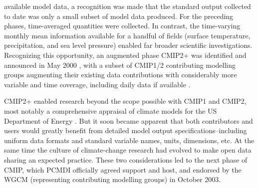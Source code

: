 \documentclass[gmd, preprint]{copernicus}
\newcommand{\mycomment}[1]{}
\begin{document}
available model data, a recognition was made that the standard output collected to date was only a small subset of model data produced. For the preceding phases, time-averaged quantities were collected. In contrast, the time-varying monthly mean information available for a handful of fields (surface temperature, precipitation, and sea level pressure) enabled far broader scientific investigations. Recognizing this opportunity, an augmented phase CMIP2+ was identified and announced in May 2000 \citep{villwock_6th_2003, meehl_cmip_2003, meehl_overview_2005}, with a subset of CMIP1/2 contributing modelling groups augmenting their existing data contributions with considerably more variable and time coverage, including daily data if available \citep{achutarao_pcmdi_2004}.

CMIP2+ enabled research beyond the scope possible with CMIP1 and CMIP2, most notably a comprehensive appraisal of climate models for the US Department of Energy \citep{achutarao_pcmdi_2004}. But it soon became apparent that both contributors and users would greatly benefit from detailed model output specifications--including uniform data formats and standard variable names, units, dimensions, etc. At the same time the culture of climate-change research had evolved to make open data sharing an expected practice. These two considerations led to the next phase of CMIP, which PCMDI officially agreed support and host, and endorsed by the WGCM (representing contributing modelling groups) in October 2003.

\mycomment{
Curt C to provide a sentence or two about the dramatic growth of the registered subprojects that had been the standard engagement way in AMIP1/2, CMIP1/2 and how that
led to the opening up of the CMIP3 archive to open-access 85 FTP, and no registered subprojects? - If I have that right?

WGOMD establishment after WGCM-2 in Melbourne Oct 1998 - see https://eprints.soton.ac.uk/30149/1/040_wgcm4.pdf#Page=9 /sect3.5 also JSC-21 also see https://www.wcrp-climate.org/modelling-wgcm-publications
CMIP1/2/2+ announcement emails for timing - https://web.archive.org/web/20040827091054/http://www-pcmdi.llnl.gov/cmip/
Also PMIP 1991 - prescribed SSTs AGCMs \citep{braconnot_paleoclimate_2011} \textbf{(Karl to help here)}
Also AMIP2 proceedings, Gleckler et al 2005 - https://pcmdi.llnl.gov/mips/amip/amip2_workshop_proceedings.pdf#page=11 - https://www.osti.gov/biblio/15014509
And Potter 1999 - new strategy beyond AMIP - https://www.osti.gov/biblio/791127
Also Meehl 2019 https://www.wcrp-climate.org/images/AGU2019/presentations/Symposium/11-Meehl_WCRP40.pdf
}
\end{document}

